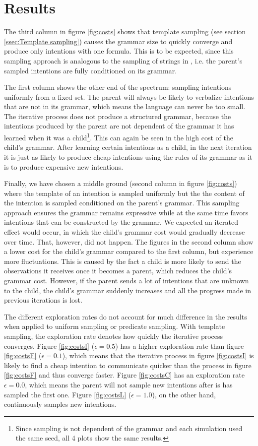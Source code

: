 \documentclass[a4paper]{article}
\begin{document}
\section{Results}
\label{sec:results}
The third column in figure \ref{fig:costs} shows that template sampling (see section \ref{ssec:Template sampling}) causes the grammar size to quickly converge and produce only intentions with one formula. This is to be expected, since this sampling approach is analogous to the sampling of strings in \cite{zuidema2003poverty}, i.e. the parent's sampled intentions are fully conditioned on its grammar.

The first column shows the other end of the spectrum: sampling intentions uniformly from a fixed set. The parent will always be likely to verbalize intentions that are not in its grammar, which means the language can never be too small. The iterative process does not produce a structured grammar, because the intentions produced by the parent are not dependent of the grammar it has learned when it was a child\footnote{Since sampling is not dependent of the grammar and each simulation used the same seed, all 4 plots show the same results.}. This can again be seen in the high cost of the child's grammar. After learning certain intentions as a child, in the next iteration it is just as likely to produce cheap intentions using the rules of its grammar as it is to produce expensive new intentions.

Finally, we have chosen a middle ground (second column in figure \ref{fig:costs}) where the template of an intention is sampled uniformly but the the content of the intention is sampled conditioned on the parent's grammar. This sampling approach ensures the grammar remains expressive while at the same time favors intentions that can be constructed by the grammar. We expected an iterated effect would occur, in which the child's grammar cost would gradually decrease over time. That, however, did not happen. The figures in the second column show a lower cost for the child's grammar compared to the first column, but experience more fluctuations. This is caused by the fact a child is more likely to send the observations it receives once it becomes a parent, which reduces the child's grammar cost. However, if the parent sends a lot of intentions that are unknown to the child, the child's grammar suddenly increases and all the progress made in previous iterations is lost.

The different exploration rates do not account for much difference in the results when applied to uniform sampling or predicate sampling. With template sampling, the exploration rate denotes how quickly the iterative process converges. Figure \ref{fig:costsI} ($\epsilon = 0.5$) has a higher exploration rate than figure \ref{fig:costsF} ($\epsilon = 0.1$), which means that the iterative process in figure \ref{fig:costsI} is likely to find a cheap intention to communicate quicker than the process in figure \ref{fig:costsF} and thus converge faster. Figure \ref{fig:costsC} has an exploration rate $\epsilon = 0.0$, which means the parent will not sample new intentions after is has sampled the first one. Figure \ref{fig:costsL} ($\epsilon = 1.0$), on the other hand, continuously samples new intentions. 
\end{document}
